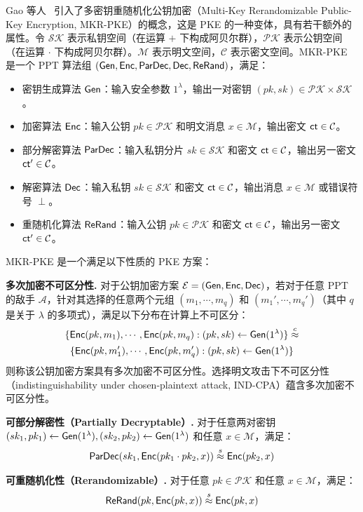 Gao 等人~\cite{GNT-eprint-2023} 引入了多密钥重随机化公钥加密（Multi-Key Rerandomizable Public-Key Encryption, MKR-PKE）的概念，这是 PKE 的一种变体，具有若干额外的属性。令 $\mathcal{SK}$ 表示私钥空间（在运算 $+$ 下构成阿贝尔群），$\mathcal{PK}$ 表示公钥空间（在运算 $\cdot$ 下构成阿贝尔群）。$\mathcal{M}$ 表示明文空间，$\mathcal{C}$ 表示密文空间。MKR-PKE 是一个 PPT 算法组 $(\mathsf{Gen}, \mathsf{Enc}, \mathsf{ParDec}, \mathsf{Dec}, \mathsf{ReRand})$，满足：
\begin{itemize}
\item 密钥生成算法 $\mathsf{Gen}$：输入安全参数 $1^\lambda$，输出一对密钥 $(pk, sk) \in \mathcal{PK} \times \mathcal{SK}$。
\item 加密算法 $\mathsf{Enc}$：输入公钥 $pk \in \mathcal{PK}$ 和明文消息 $x \in \mathcal{M}$，输出密文 $\mathsf{ct} \in \mathcal{C}$。
\item 部分解密算法 $\mathsf{ParDec}$：输入私钥分片 $sk \in \mathcal{SK}$ 和密文 $\mathsf{ct} \in \mathcal{C}$，输出另一密文 $\mathsf{ct}' \in \mathcal{C}$。
\item 解密算法 $\mathsf{Dec}$：输入私钥 $sk \in \mathcal{SK}$ 和密文 $\mathsf{ct} \in \mathcal{C}$，输出消息 $x \in \mathcal{M}$ 或错误符号 $\perp$。
\item 重随机化算法 $\mathsf{ReRand}$：输入公钥 $pk \in \mathcal{PK}$ 和密文 $\mathsf{ct} \in \mathcal{C}$，输出另一密文 $\mathsf{ct}' \in \mathcal{C}$。
\end{itemize}

MKR-PKE 是一个满足以下性质的 PKE 方案：

\begin{trivlist}
\item \textbf{多次加密不可区分性.} 对于公钥加密方案 $\mathcal{E} = (\mathsf{Gen}, \mathsf{Enc}, \mathsf{Dec})$，若对于任意 PPT 的敌手 $\mathcal{A}$，针对其选择的任意两个元组 $(m_1, \cdots, m_q)$ 和 $({m}_1', \cdots, {m}_{q}')$（其中 $q$ 是关于 $\lambda$ 的多项式），满足以下分布在计算上不可区分：
\begin{gather*}
   \{\mathsf{Enc}(pk,m_1), \cdots, \mathsf{Enc}(pk,m_q):(pk,sk) \gets \mathsf{Gen}(1^\lambda)\} \overset{c}{\approx} \\
   \{\mathsf{Enc}(pk,{m}_1'), \cdots, \mathsf{Enc}(pk,{m}_{q}'):(pk,sk) \gets \mathsf{Gen}(1^\lambda)\}
\end{gather*}
则称该公钥加密方案具有多次加密不可区分性。选择明文攻击下不可区分性（indistinguishability under chosen-plaintext attack, IND-CPA）蕴含多次加密不可区分性。

\item \textbf{可部分解密性（Partially Decryptable）.} 对于任意两对密钥 $(sk_1, pk_1) \gets \mathsf{Gen}(1^\lambda), (sk_2, pk_2) \gets \mathsf{Gen}(1^\lambda)$ 和任意 $x \in \mathcal{M}$，满足：
\begin{gather*}
\mathsf{ParDec}(sk_1, \mathsf{Enc}(pk_1 \cdot pk_2,x)) \overset{s}{\approx} \mathsf{Enc}(pk_2,x)
\end{gather*}

\item \textbf{可重随机化性（Rerandomizable）.} 对于任意 $pk \in \mathcal{PK}$ 和任意 $x \in \mathcal{M}$，满足：
$$\mathsf{ReRand}(pk,\mathsf{Enc}(pk,x)) \overset{s}{\approx} \mathsf{Enc}(pk,x)$$
\end{trivlist}

